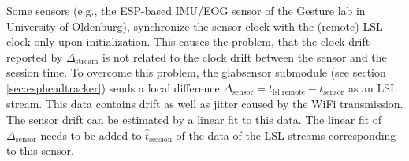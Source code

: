Some sensors (e.g., the ESP-based IMU/EOG sensor of the Gesture lab in
University of Oldenburg), synchronize the sensor clock with the
(remote) LSL clock only upon initialization. This causes the problem,
that the clock drift reported by $\Delta_\text{stream}$ is not related
to the clock drift between the sensor and the session time. To
overcome this problem, the  glabsensor submodule
(see section \ref{sec:espheadtracker}) sends a local difference
$\Delta_\text{sensor}=t_\text{lsl,remote}-t_\text{sensor}$ as an LSL
stream. This data contains drift as well as jitter caused by the WiFi
transmission. The sensor drift can be estimated by a linear fit to
this data. The linear fit of $\Delta_\text{sensor}$ needs to be added
to $\hat{t}_\text{session}$ of the data of the LSL streams
corresponding to this sensor.

